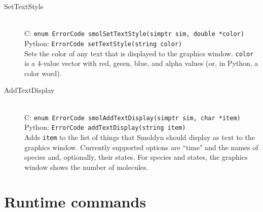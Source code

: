 \documentclass {book}
\newcommand {\ttt} {\texttt}
\begin{document}
\begin{description}
\item[SetTextStyle]
\hfill \\
C: \ttt{enum ErrorCode smolSetTextStyle(simptr sim, double *color)}\\
Python: \ttt{ErrorCode setTextStyle(string color)}\\
Sets the color of any text that is displayed to the graphics window. \ttt{color} is a 4-value vector with red, green, blue, and alpha values (or, in Python, a color word).

\item[AddTextDisplay]
\hfill \\
C: \ttt{enum ErrorCode smolAddTextDisplay(simptr sim, char *item)}\\
Python: \ttt{ErrorCode addTextDisplay(string item)}\\
Adds \ttt{item} to the list of things that Smoldyn should display as text to the graphics window. Currently supported options are ``time" and the names of species and, optionally, their states. For species and states, the graphics window shows the number of molecules.

\end{description}

\section{Runtime commands}
\end{document}
